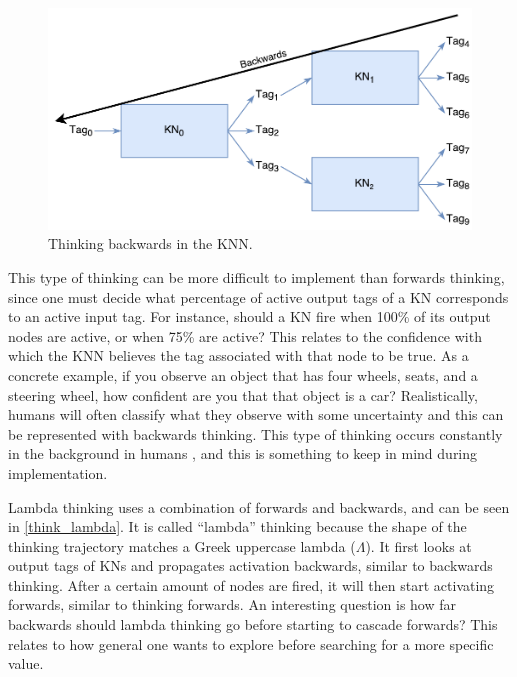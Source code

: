\documentclass[titlepage,11pt]{article}
\begin{document}
\begin{figure}[!htb]
	\includegraphics[width=\columnwidth]{figures/backwards_thinking.pdf}
	\caption{Thinking backwards in the KNN.}
	\label{think_backwards}
\end{figure}

This type of thinking can be more difficult to implement than forwards thinking, since one must decide what percentage of active output tags of a KN corresponds to an active input tag. For instance, should a KN fire when 100\% of its output nodes are active, or when 75\% are active? This relates to the confidence with which the KNN believes the tag associated with that node to be true. As a concrete example, if you observe an object that has four wheels, seats, and a steering wheel, how confident are you that that object is a car? Realistically, humans will often classify what they observe with some uncertainty \cite{uncertainty} and this can be represented with backwards thinking. This type of thinking occurs constantly in the background in humans \cite{vybihal-knowledge}, and this is something to keep in mind during implementation.

Lambda thinking uses a combination of forwards and backwards, and can be seen in \autoref{think_lambda}. It is called ``lambda'' thinking because the shape of the thinking trajectory matches a Greek uppercase lambda ($\Lambda$). It first looks at output tags of KNs and propagates activation backwards, similar to backwards thinking. After a certain amount of nodes are fired, it will then start activating forwards, similar to thinking forwards. An interesting question is how far backwards should lambda thinking go before starting to cascade forwards? This relates to how general one wants to explore before searching for a more specific value.
\end{document}
